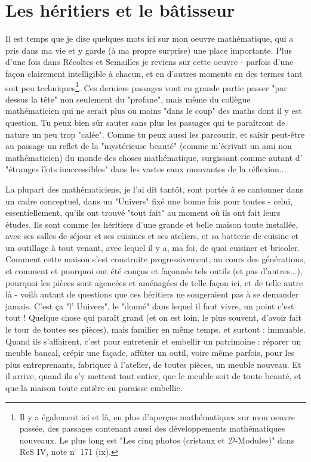 \section{Les héritiers et le bâtisseur}

Il est temps que je dise quelques mots ici sur mon oeuvre mathématique, qui a pris dans ma vie et y garde (à ma propre surprise) une place importante. Plus d'une fois dans Récoltes et Semailles je reviens sur cette oeuvre - parfois d'une façon clairement intelligible à chacun, et en d'autres moments en des termes tant soit peu techniques\footnote{Il y a également ici et là, en plus d'aperçus mathématiques sur mon oeuvre passée, des passages contenant aussi des développements mathématiques nouveaux. Le plus long est "Les cinq photos (cristaux et $\mathscr{D}$-Modules)" dans ReS IV, note n$^{\circ}$ 171 (ix).}. Ces derniers passages vont en grande partie passer "par dessus la tête" non seulement du "profane", mais même du collègue mathématicien qui ne serait plus ou moins "dans le coup" des maths dont il y est question. Tu peux bien sûr sauter sans plus les passages qui te paraîtront de nature un peu trop "calée". Comme tu peux aussi les parcourir, et saisir peut-être au passage un reflet de la "mystérieuse beauté" (comme m'écrivait un ami non mathématicien) du monde des choses mathématique, surgissant comme autant d' "étranges îlots inaccessibles" dans les vastes eaux mouvantes de la réflexion...

La plupart des mathématiciens, je l'ai dit tantôt, sont portés à se cantonner dans un cadre conceptuel, dans un "Univers" fixé une bonne fois pour toutes - celui, essentiellement, qu'ils ont trouvé "tout fait" au moment où ils ont fait leurs études. Ils sont comme les héritiers d'une grande et belle maison toute installée, avec ses salles de séjour et ses cuisines et ses ateliers, et sa batterie de cuisine et un outillage à tout venant, avec lequel il y a, ma foi, de quoi cuisiner et bricoler. Comment cette maison s'est construite progressivement, au cours des générations, et comment et pourquoi ont été conçus et façonnés tels outils (et pas d'autres...), pourquoi les pièces sont agencées et aménagées de telle façon ici, et de telle autre là - voilà autant de questions que ces héritiers ne songeraient pas à se demander jamais. C'est ça "l' Univers", le "donné" dans lequel il faut vivre, un point c'est tout ! Quelque chose qui paraît grand (et on est loin, le plus souvent, d'avoir fait le tour de toutes ses pièces), mais familier en même temps, et surtout : immuable. Quand ils s'affairent, c'est pour entretenir et embellir un patrimoine : réparer un meuble bancal, crépir une façade, affûter un outil, voire même parfois, pour les plus entreprenants, fabriquer à l'atelier, de toutes pièces, un meuble nouveau. Et il arrive, quand ils s'y mettent tout entier, que le meuble soit de toute beauté, et que la maison toute entière en paraisse embellie.

